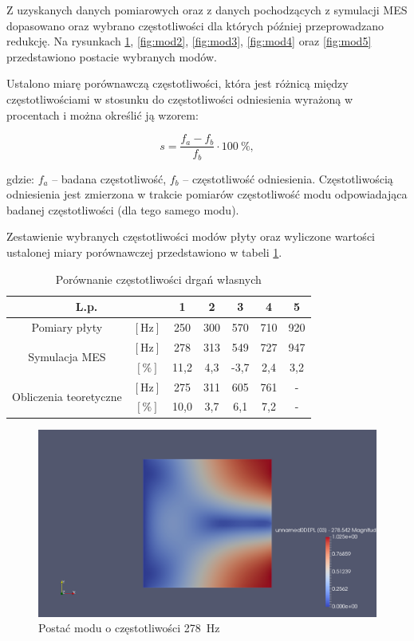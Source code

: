 \documentclass[polish,a4paper,11pt]{mwart}
\begin{document}
Z uzyskanych danych pomiarowych oraz z danych pochodzących z symulacji MES
dopasowano oraz wybrano częstotliwości dla których później przeprowadzano
redukcję. Na rysunkach \ref{fig:mod1}, \ref{fig:mod2}, \ref{fig:mod3},
\ref{fig:mod4} oraz
\ref{fig:mod5} przedstawiono postacie wybranych modów.

Ustalono miarę porównawczą częstotliwości, która jest różnicą między
częstotliwościami w stosunku do częstotliwości odniesienia wyrażoną w
procentach  i można określić ją wzorem:

\begin{equation}
  s = \frac{f_a - f_b}{f_b} \cdot \SI{100}{\percent},
\end{equation}

gdzie: $f_a$ -- badana częstotliwość, $f_b$ -- częstotliwość odniesienia.
Częstotliwością odniesienia jest zmierzona w trakcie pomiarów częstotliwość
modu odpowiadająca badanej częstotliwości (dla tego samego modu). 

Zestawienie wybranych częstotliwości modów płyty oraz wyliczone wartości
ustalonej miary porównawczej przedstawiono w tabeli \ref{tab:identyfikacja}.

\begin{table}[!tbh]
  \centering
  \caption{Porównanie częstotliwości drgań własnych}
  \begin{tabular}{|cc|c|c|c|c|c|} \hline
    \multicolumn{2}{|c|}{L.p.} & 1 & 2 & 3 & 4 & 5 \\ \hline
    Pomiary płyty & $[\si{\hertz}]$ & 250 & 300 & 570 & 710 & 920 \\ \hline
    \multirow{2}{*}{Symulacja MES} & $[\si{\hertz}]$ & 278 & 313 & 549 & 727 & 947 \\\cline{3-7}
				   & $[\si{\percent}]$ & 11,2 & 4,3 & -3,7 & 2,4 & 3,2 \\\hline
    \multirow{2}{*}{Obliczenia teoretyczne} & $[\si{\hertz}]$ & 275 & 311 & 605 & 761 & - \\\cline{3-7}
					    & $[\si{\percent}]$ & 10,0 & 3,7 & 6,1 & 7,2 & - \\\hline
  \end{tabular}
  \label{tab:identyfikacja}
\end{table}

\begin{figure}[!tbh]
  \centering
  \includegraphics[width=\textwidth]{./plate_vib/278Hz.png}
  \caption{Postać modu o częstotliwości \SI{278}{\hertz}}
  \label{fig:mod1}
\end{figure}
\end{document}
